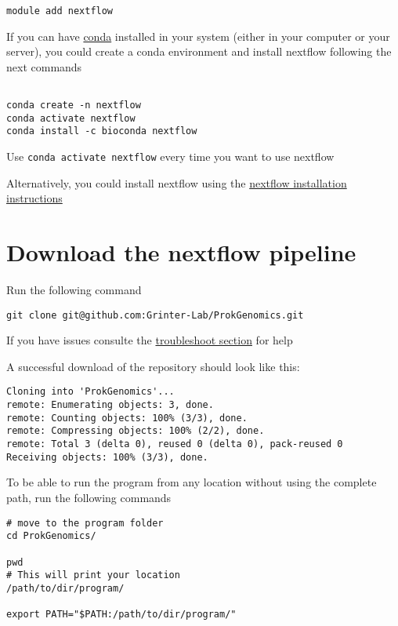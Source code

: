 \documentclass[
]{book}
\begin{document}
\begin{verbatim}
module add nextflow
\end{verbatim}

If you can have \href{https://conda.io/projects/conda/en/latest/user-guide/getting-started.html}{conda} installed in your system (either in your computer or your server), you could create a conda environment and install nextflow following the next commands

\begin{verbatim}

conda create -n nextflow
conda activate nextflow
conda install -c bioconda nextflow

\end{verbatim}

Use \texttt{conda\ activate\ nextflow} every time you want to use nextflow

Alternatively, you could install nextflow using the \href{https://www.nextflow.io/docs/latest/getstarted.html}{nextflow installation instructions}

\hypertarget{download-the-nextflow-pipeline}{%
\section{Download the nextflow pipeline}\label{download-the-nextflow-pipeline}}

Run the following command

\begin{verbatim}
git clone git@github.com:Grinter-Lab/ProkGenomics.git
\end{verbatim}

If you have issues consulte the \href{troubleshooting.html}{troubleshoot section} for help

A successful download of the repository should look like this:

\begin{verbatim}
Cloning into 'ProkGenomics'...
remote: Enumerating objects: 3, done.
remote: Counting objects: 100% (3/3), done.
remote: Compressing objects: 100% (2/2), done.
remote: Total 3 (delta 0), reused 0 (delta 0), pack-reused 0
Receiving objects: 100% (3/3), done.
\end{verbatim}

To be able to run the program from any location without using the complete path, run the following commands

\begin{verbatim}
# move to the program folder
cd ProkGenomics/

pwd 
# This will print your location
/path/to/dir/program/

export PATH="$PATH:/path/to/dir/program/"
\end{verbatim}
\end{document}
